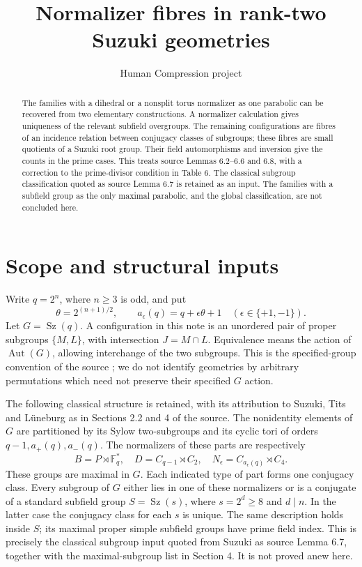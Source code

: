 \documentclass[11pt,a4paper]{article}
\title{Normalizer fibres in rank-two Suzuki geometries}
\author{Human Compression project}\date{}
\newcommand{\F}{\mathbb F}
\newcommand{\Sz}{\operatorname{Sz}}
\newcommand{\Aut}{\operatorname{Aut}}
\begin{document}
\maketitle
\begin{abstract}
The families with a dihedral or a nonsplit torus normalizer as one
parabolic can be recovered from two elementary constructions. A
normalizer calculation gives uniqueness of the relevant subfield
overgroups. The remaining configurations are fibres of an incidence
relation between conjugacy classes of subgroups; these fibres are small
quotients of a Suzuki root group. Their field automorphisms and inversion
give the counts in the prime cases. This treats source Lemmas 6.2--6.6
and 6.8, with a correction to the prime-divisor condition in Table 6.
The classical subgroup classification quoted as source Lemma 6.7 is
retained as an input. The families with a subfield group as the only
maximal parabolic, and the global classification, are not concluded here.
\end{abstract}

\section{Scope and structural inputs}
Write $q=2^n$, where $n\ge3$ is odd, and put
\[
 \theta=2^{(n+1)/2},\qquad a_\epsilon(q)=q+\epsilon\theta+1
 \quad(\epsilon\in\{+1,-1\}).
\]
Let $G=\Sz(q)$. A configuration in this note is an unordered pair
of proper subgroups $\{M,L\}$, with intersection $J=M\cap L$.
Equivalence means the action of $\Aut(G)$, allowing interchange of
the two subgroups. This is the specified-group convention of the
source \cite{source}; we do not identify geometries by arbitrary
permutations which need not preserve their specified $G$ action.

The following classical structure is retained, with its attribution
to Suzuki, Tits and L\"uneburg as in Sections 2.2 and 4 of the
source. The nonidentity elements of $G$ are partitioned by its Sylow
two-subgroups and its cyclic tori of orders $q-1,a_+(q),a_-(q)$.
The normalizers of these parts are respectively
\[
 B=P\rtimes\F_q^*,\quad D=C_{q-1}\rtimes C_2,
 \quad N_\epsilon=C_{a_\epsilon(q)}\rtimes C_4.
                                                        \tag{1}
\]
These groups are maximal in $G$. Each indicated type of part forms
one conjugacy class. Every subgroup of $G$ either lies in one of
these normalizers or is a conjugate of a standard subfield group
$S=\Sz(s)$, where $s=2^d\ge8$ and $d\mid n$. In the latter case
the conjugacy class for each $s$ is unique. The same description
holds inside $S$; its maximal proper simple subfield groups have
prime field index. This is precisely the classical subgroup input
quoted from Suzuki \cite{suzuki} as source Lemma 6.7, together with
the maximal-subgroup list in Section 4. It is not proved anew here.
\end{document}
